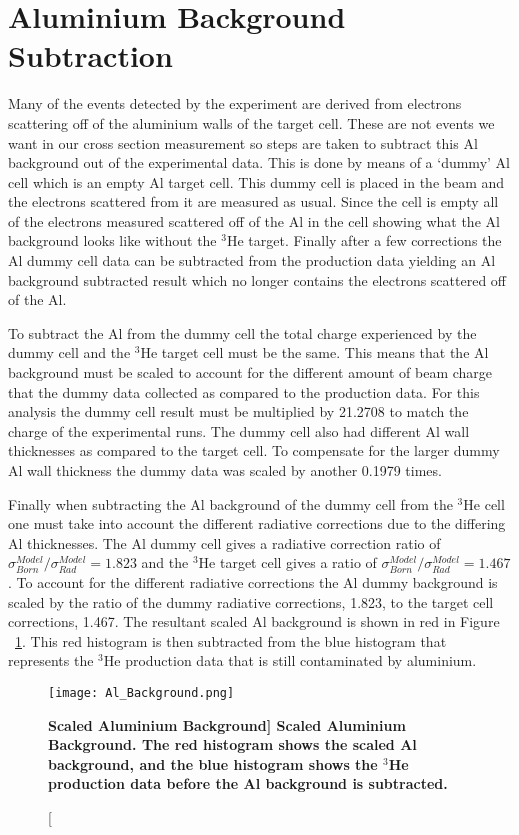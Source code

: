 \section{Aluminium Background Subtraction}
\label{sec:al}

Many of the events detected by the experiment are derived from electrons scattering off of the aluminium walls of the target cell. These are not events we want in our cross section measurement so steps are taken to subtract this Al background out of the experimental data. This is done by means of a `dummy' Al cell which is an empty Al target cell. This dummy cell is placed in the beam and the electrons scattered from it are measured as usual. Since the cell is empty all of the electrons measured scattered off of the Al in the cell showing what the Al background looks like without the $^3$He target. Finally after a few corrections the Al dummy cell data can be subtracted from the production data yielding an Al background subtracted result which no longer contains the electrons scattered off of the Al.

To subtract the Al from the dummy cell the total charge experienced by the dummy cell and the $^3$He target cell must be the same. This means that the Al background must be scaled to account for the different amount of beam charge that the dummy data collected as compared to the production data. For this analysis the dummy cell result must be multiplied by 21.2708 to match the charge of the experimental runs. The dummy cell also had different Al wall thicknesses as compared to the target cell. To compensate for the larger dummy Al wall thickness the dummy data was scaled by another 0.1979 times.

Finally when subtracting the Al background of the dummy cell from the $^3$He cell one must take into account the different radiative corrections due to the differing Al thicknesses. The Al dummy cell gives a radiative correction ratio of $\sigma^{Model}_{Born}/\sigma^{Model}_{Rad} = 1.823$ and the $^3$He target cell gives a ratio of $\sigma^{Model}_{Born}/\sigma^{Model}_{Rad} = 1.467$. To account for the different radiative corrections the Al dummy background is scaled by the ratio of the dummy radiative corrections, 1.823, to the target cell corrections, 1.467. The resultant scaled Al background is shown in red in Figure ~\ref{fig:al}. This red histogram is then subtracted from the blue histogram that represents the $^3$He production data that is still contaminated by aluminium. 

\begin{figure}[!ht]
\begin{center}
\texttt{[image: Al\_Background.png]}
\end{center}
\caption[\bf{Scaled Aluminium Background}]{
{\bf{Scaled Aluminium Background.}} The red histogram shows the scaled Al background, and the blue histogram shows the $^3$He production data before the Al background is subtracted.}
\label{fig:al}
\end{figure}

